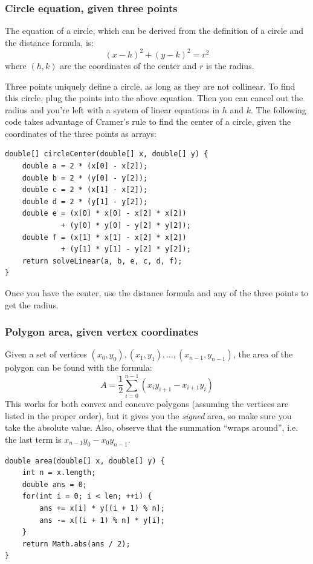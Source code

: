 \documentclass[a4paper,12pt]{article}
\begin{document}
\subsubsection{Circle equation, given three points}
\noindent The equation of a circle, which can be derived from the definition of a circle and the distance formula, is:
\[(x-h)^2+(y-k)^2=r^2\]
\noindent where $(h,k)$ are the coordinates of the center and $r$ is the radius.

Three points uniquely define a circle, as long as they are not collinear. To find this circle, plug the points into the above equation. Then you can cancel out the radius and you're left with a system of linear equations in $h$ and $k$. The following code takes advantage of Cramer's rule to find the center of a circle, given the coordinates of the three points as arrays:

\begin{lstlisting}
double[] circleCenter(double[] x, double[] y) {
	double a = 2 * (x[0] - x[2]);
	double b = 2 * (y[0] - y[2]);
	double c = 2 * (x[1] - x[2]);
	double d = 2 * (y[1] - y[2]);
	double e = (x[0] * x[0] - x[2] * x[2])
	         + (y[0] * y[0] - y[2] * y[2]);
	double f = (x[1] * x[1] - x[2] * x[2])
	         + (y[1] * y[1] - y[2] * y[2]);
	return solveLinear(a, b, e, c, d, f);
}
\end{lstlisting}

Once you have the center, use the distance formula and any of the three points to get the radius.

\subsubsection{Polygon area, given vertex coordinates}
\noindent Given a set of vertices $(x_0, y_0), (x_1, y_1), \dots, (x_{n-1}, y_{n-1})$, the area of the polygon can be found with the formula:
\[A=\frac{1}{2}\sum_{i=0}^{n-1}\left(x_i y_{i+1}-x_{i+1} y_i\right)\]
This works for both convex and concave polygons (assuming the vertices are listed in the proper order), but it gives you the {\em signed} area, so make sure you take the absolute value. Also, observe that the summation ``wraps around'', i.e. the last term is $x_{n-1} y_0-x_0 y_{n-1}$.
\begin{lstlisting}
double area(double[] x, double[] y) {
	int n = x.length;
	double ans = 0;
	for(int i = 0; i < len; ++i) {
		ans += x[i] * y[(i + 1) % n];
		ans -= x[(i + 1) % n] * y[i];
	}
	return Math.abs(ans / 2);
}
\end{lstlisting}
\end{document}
